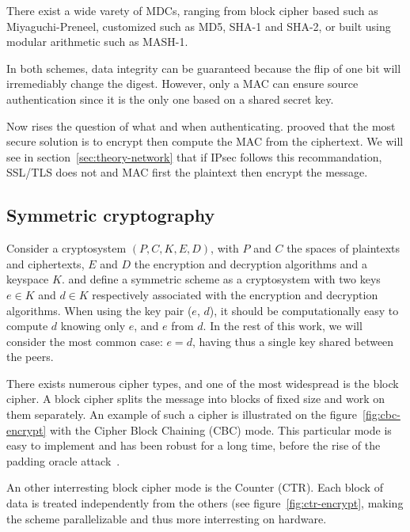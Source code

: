 \noindent There exist a wide varety of MDCs, ranging from block cipher based such as Miyaguchi-Preneel, customized such as MD5, SHA-1 and SHA-2, or built using modular arithmetic such as MASH-1.

In both schemes, data integrity can be guaranteed because the flip of one bit will irremediably change the digest.
However, only a MAC can ensure source authentication since it is the only one based on a shared secret key.

Now rises the question of what and when authenticating.
\citet{Bellare2000} prooved that the most secure solution is to encrypt then compute the MAC from the ciphertext.
We will see in section~\ref{sec:theory-network} that if IPsec follows this recommandation, SSL/TLS does not and MAC first the plaintext then encrypt the message.







\subsection{Symmetric cryptography}
Consider a cryptosystem $(P,C,K,E,D)$, with $P$ and $C$ the spaces of plaintexts and ciphertexts, $E$ and $D$ the encryption and decryption algorithms and a keyspace $K$.
\citet{Menezes1996} and \citet{infof405} define a symmetric scheme as a cryptosystem with two keys $e \in K$ and $d \in K$ respectively associated with the encryption and decryption algorithms.
When using the key pair ($e$, $d$), it should be computationally easy to compute $d$ knowing only $e$, and $e$ from $d$.
In the rest of this work, we will consider the most common case: $e = d$, having thus a single key shared between the peers.

There exists numerous cipher types, and one of the most widespread is the block cipher.
A block cipher splits the message into blocks of fixed size and work on them separately.
An example of such a cipher is illustrated on the figure~\ref{fig:cbc-encrypt} with the Cipher Block Chaining (CBC) mode.
This particular mode is easy to implement and has been robust for a long time, before the rise of the padding oracle attack~\cite{vaudenay2002}.

\indent An other interresting block cipher mode is the Counter (CTR).
Each block of data is treated independently from the others (see figure~\ref{fig:ctr-encrypt}, making the scheme parallelizable and thus more interresting on hardware.


